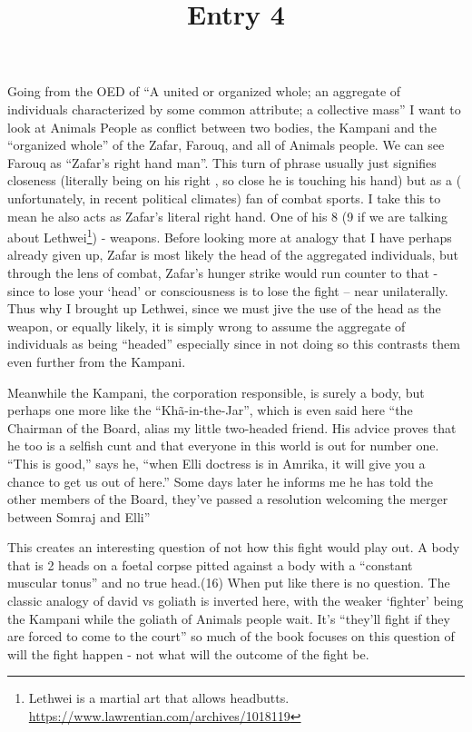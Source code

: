 \documentclass{article}
\title{Entry 4}
\begin{document}
Going from the OED of ``A united or organized whole; an aggregate of individuals characterized
by some common attribute; a collective mass'' I want to look at Animals People as conflict between two bodies, the Kampani and the ``organized whole'' of the Zafar, Farouq, and all of Animals people. 
We can see Farouq as ``Zafar’s right hand man''. This turn of phrase usually just signifies closeness (literally being on his right , so close he is touching his hand) but as a ( unfortunately, in recent political climates) fan of combat sports. I take this to mean he also acts as Zafar's literal right hand. One of his 8 (9 if we are talking about Lethwei\footnote{Lethwei is a martial art that allows headbutts. \url{https://www.lawrentian.com/archives/1018119}})  - weapons. Before looking more at analogy that I have perhaps already given up, Zafar is most likely the head of the aggregated individuals, but through the lens of combat, Zafar's hunger strike would run counter to that - since to lose your `head' or consciousness  is to lose the fight -- near unilaterally. Thus why I brought up Lethwei, since we must jive the use of the head as the weapon, or equally likely, it is simply wrong to assume the aggregate of individuals as being ``headed'' especially since in not doing so this contrasts them even further from the Kampani.

Meanwhile the Kampani, the corporation responsible, is surely a body, but perhaps one more like the ``Khã-in-the-Jar'', which is even said here ``the Chairman of the Board, alias my little two-headed friend. His advice proves that he too is a selfish cunt and that everyone in this world is out for number one. “This is good,” says he, “when Elli doctress is in Amrika, it will give you a chance to get us out of here.” Some days later he informs me he has told the other members of the Board, they’ve passed a resolution welcoming the merger between Somraj and Elli'' 

This creates an interesting question of not how this fight would play out. A body that is 2 heads on a foetal corpse pitted against a body with a ``constant muscular tonus'' and no true head.(16) When put like there is no question. The classic analogy of david vs goliath is inverted here, with the weaker `fighter' being the Kampani while the goliath of Animals people wait. It's ``they’ll fight if they are forced to come to the court'' so much of the book focuses on this question of will the fight happen - not what will the outcome of the fight be. 
\end{document}
